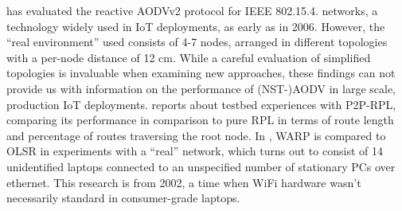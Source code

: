 \documentclass[a4paper,10pt]{scrartcl}
\begin{document}
\cite{gomez_NSTAODV_eval} has evaluated the reactive AODVv2 protocol for IEEE 802.15.4. networks, a technology widely used in IoT deployments, as early as in 2006. However, the ``real environment'' used consists of 4-7 nodes, arranged in different topologies with a per-node distance of 12 cm. While a careful evaluation of simplified topologies is invaluable when examining new approaches, these findings can not provide us with information on the performance of (NST-)AODV in large scale, production IoT deployments.
\cite{baccelli_p2p_rpl} reports about testbed experiences with P2P-RPL, comparing its performance in comparison to pure RPL in terms of route length and percentage of routes traversing the root node.
In \cite{WARP}, WARP is compared to OLSR in experiments with a ``real'' network, which turns out to consist of 14 unidentified laptops connected to an unspecified number of stationary PCs over ethernet. This research is from 2002, a time when WiFi hardware wasn't necessarily standard in consumer-grade laptops.\\
\end{document}
